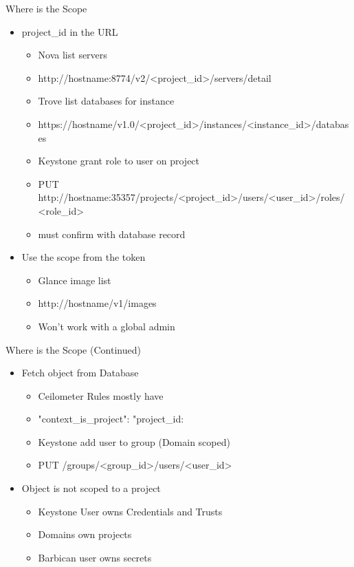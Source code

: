 \documentclass{beamer}
\begin{document}
\begin{frame}{Where is the Scope}
  \begin{itemize}

  \item project\_id in the URL
    \begin{itemize}
    \item Nova list servers
    \item http://hostname:8774/v2/<project\_id>/servers/detail
    \item Trove list databases for instance
    \item https://hostname/v1.0/<project\_id>/instances/<instance\_id>/databases
    \item Keystone grant role to user on project
    \item PUT http://hostname:35357/projects/<project\_id>/users/<user\_id>/roles/<role\_id>
    \item must confirm with database record
    \end{itemize}

  \item Use the scope from the token
    \begin{itemize}
    \item Glance image list
    \item http://hostname/v1/images
    \item Won't work with a global admin
    \end{itemize}
  \end{itemize}
\end{frame}

\begin{frame}{Where is the Scope (Continued)}
  \begin{itemize}    
  \item Fetch object from Database
    \begin{itemize}
    \item Ceilometer Rules mostly have
    \item "context\_is\_project": "project\_id:%
    \item Keystone add user to group (Domain scoped)
    \item PUT /groups/<group\_id>/users/<user\_id>
    \end{itemize}

  \item Object is not scoped to a project
    \begin{itemize}
    \item Keystone User owns Credentials and Trusts
    \item Domains own projects
    \item Barbican user owns secrets
    \end{itemize}
  \end{itemize}
\end{frame}
\end{document}
